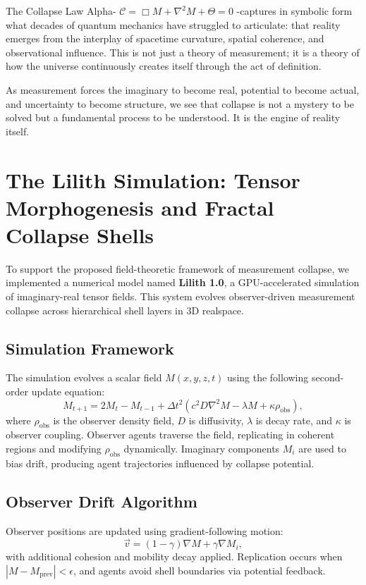 The Collapse Law Alpha- $\mathcal{C} = \Box M + \nabla^2 M + \Theta = 0$ -captures in symbolic form what decades of quantum mechanics have struggled to articulate: that reality emerges from the interplay of spacetime curvature, spatial coherence, and observational influence. This is not just a theory of measurement; it is a theory of how the universe continuously creates itself through the act of definition.

As measurement forces the imaginary to become real, potential to become actual, and uncertainty to become structure, we see that collapse is not a mystery to be solved but a fundamental process to be understood. It is the engine of reality itself.

\section{The Lilith Simulation: Tensor Morphogenesis and Fractal Collapse Shells}

To support the proposed field-theoretic framework of measurement collapse, we implemented a numerical model named \textbf{Lilith 1.0}, a GPU-accelerated simulation of imaginary-real tensor fields. This system evolves observer-driven measurement collapse across hierarchical shell layers in 3D realspace.

\subsection{Simulation Framework}

The simulation evolves a scalar field $M(x, y, z, t)$ using the following second-order update equation:
\begin{equation}
M_{t+1} = 2M_t - M_{t-1} + \Delta t^2 \left( c^2 D \nabla^2 M - \lambda M + \kappa \rho_{\text{obs}} \right),
\end{equation}
where $\rho_{\text{obs}}$ is the observer density field, $D$ is diffusivity, $\lambda$ is decay rate, and $\kappa$ is observer coupling. Observer agents traverse the field, replicating in coherent regions and modifying $\rho_{\text{obs}}$ dynamically. Imaginary components $M_i$ are used to bias drift, producing agent trajectories influenced by collapse potential.

\subsection{Observer Drift Algorithm}
Observer positions are updated using gradient-following motion:
\begin{equation}
\vec{v} = (1 - \gamma) \nabla M + \gamma \nabla M_i,
\end{equation}
with additional cohesion and mobility decay applied. Replication occurs when $|M - M_{\text{prev}}| < \epsilon$, and agents avoid shell boundaries via potential feedback.



